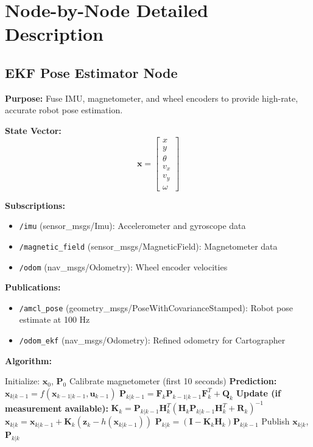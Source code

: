 \documentclass[11pt]{article}
\begin{document}
\section{Node-by-Node Detailed Description}

\subsection{EKF Pose Estimator Node}

\textbf{Purpose:} Fuse IMU, magnetometer, and wheel encoders to provide high-rate, accurate robot pose estimation.

\textbf{State Vector:}
\[
\mathbf{x} = \begin{bmatrix} x \\ y \\ \theta \\ v_x \\ v_y \\ \omega \end{bmatrix}
\]

\textbf{Subscriptions:}
\begin{itemize}
    \item \texttt{/imu} (sensor\_msgs/Imu): Accelerometer and gyroscope data
    \item \texttt{/magnetic\_field} (sensor\_msgs/MagneticField): Magnetometer data
    \item \texttt{/odom} (nav\_msgs/Odometry): Wheel encoder velocities
\end{itemize}

\textbf{Publications:}
\begin{itemize}
    \item \texttt{/amcl\_pose} (geometry\_msgs/PoseWithCovarianceStamped): Robot pose estimate at 100 Hz
    \item \texttt{/odom\_ekf} (nav\_msgs/Odometry): Refined odometry for Cartographer
\end{itemize}

\textbf{Algorithm:}

\begin{algorithm}[H]
\caption{Extended Kalman Filter}
\begin{algorithmic}[1]
\State Initialize: $\mathbf{x}_0$, $\mathbf{P}_0$
\State Calibrate magnetometer (first 10 seconds)
    \State \textbf{Prediction:}
    \State $\mathbf{x}_{k|k-1} = f(\mathbf{x}_{k-1|k-1}, \mathbf{u}_{k-1})$
    \State $\mathbf{P}_{k|k-1} = \mathbf{F}_k \mathbf{P}_{k-1|k-1} \mathbf{F}_k^T + \mathbf{Q}_k$
    \State \textbf{Update (if measurement available):}
    \State $\mathbf{K}_k = \mathbf{P}_{k|k-1} \mathbf{H}_k^T (\mathbf{H}_k \mathbf{P}_{k|k-1} \mathbf{H}_k^T + \mathbf{R}_k)^{-1}$
    \State $\mathbf{x}_{k|k} = \mathbf{x}_{k|k-1} + \mathbf{K}_k (\mathbf{z}_k - h(\mathbf{x}_{k|k-1}))$
    \State $\mathbf{P}_{k|k} = (\mathbf{I} - \mathbf{K}_k \mathbf{H}_k) \mathbf{P}_{k|k-1}$
    \State Publish $\mathbf{x}_{k|k}$, $\mathbf{P}_{k|k}$
\EndLoop
\end{algorithmic}
\end{algorithm}
\end{document}
